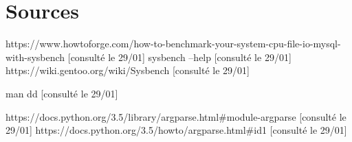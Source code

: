 \section{Sources}

https://www.howtoforge.com/how-to-benchmark-your-system-cpu-file-io-mysql-with-sysbench [consulté le 29/01]
sysbench --help [consulté le 29/01]
https://wiki.gentoo.org/wiki/Sysbench [consulté le 29/01]

man dd [consulté le 29/01]

https://docs.python.org/3.5/library/argparse.html#module-argparse [consulté le 29/01]
https://docs.python.org/3.5/howto/argparse.html#id1 [consulté le 29/01]
